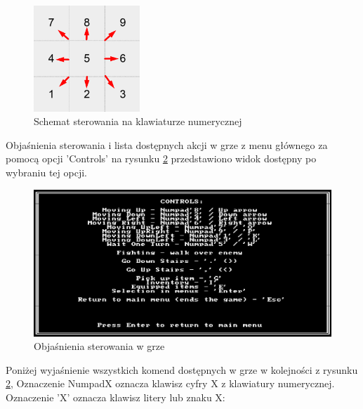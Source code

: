\documentclass[12pt,twoside]{article}
\begin{document}
\FloatBarrier
\begin{figure}[h]
	\centering
	\includegraphics[width=4cm]{images/custom/numpad_controls.png}
	\caption{Schemat sterowania na klawiaturze numerycznej}
	\label{numpad_controls}
\end{figure}
\FloatBarrier

Objaśnienia sterowania i lista dostępnych akcji w grze z menu głównego za pomocą opcji 'Controls' na rysunku \ref{mygame:scr2} przedstawiono widok dostępny po wybraniu tej opcji.

\FloatBarrier
\begin{figure}[h]
	\centering
	\includegraphics[width=16cm]{images/mygame/scr2.png}
	\caption{Objaśnienia sterowania w grze}
	\label{mygame:scr2}
\end{figure}
\FloatBarrier


Poniżej wyjaśnienie wszystkich komend dostępnych w grze w kolejności z rysunku \ref{mygame:scr2}, Oznaczenie NumpadX oznacza klawisz cyfry X z klawiatury numerycznej. Oznaczenie 'X' oznacza klawisz litery lub znaku X:
\end{document}
